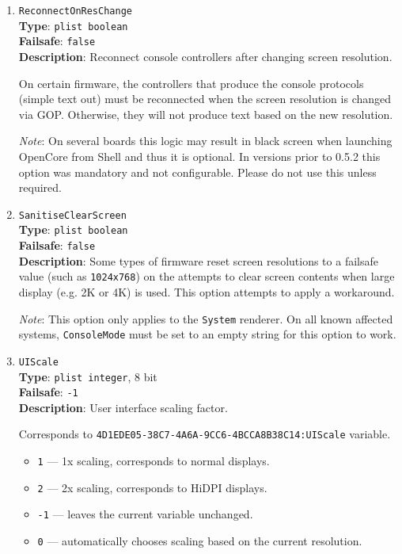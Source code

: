 \documentclass[]{article}
\providecommand{\tightlist}{%
  \setlength{\itemsep}{0pt}\setlength{\parskip}{0pt}}
\begin{document}
\begin{enumerate}
\item
  \texttt{ReconnectOnResChange}\\
  \textbf{Type}: \texttt{plist\ boolean}\\
  \textbf{Failsafe}: \texttt{false}\\
  \textbf{Description}: Reconnect console controllers after changing screen resolution.

  On certain firmware, the controllers that produce the console protocols (simple text out)
  must be reconnected when the screen resolution is changed via GOP. Otherwise, they will
  not produce text based on the new resolution.

  \emph{Note}: On several boards this logic may result in black screen when launching
  OpenCore from Shell and thus it is optional. In versions prior to 0.5.2 this option
  was mandatory and not configurable. Please do not use this unless required.

\item
  \texttt{SanitiseClearScreen}\\
  \textbf{Type}: \texttt{plist\ boolean}\\
  \textbf{Failsafe}: \texttt{false}\\
  \textbf{Description}: Some types of firmware reset screen resolutions to a failsafe
  value (such as \texttt{1024x768}) on the attempts to clear screen contents
  when large display (e.g. 2K or 4K) is used. This option attempts to apply
  a workaround.

  \emph{Note}: This option only applies to the \texttt{System} renderer.
   On all known affected systems, \texttt{ConsoleMode} must be set to
   an empty string for this option to work.

\item
  \texttt{UIScale}\\
  \textbf{Type}: \texttt{plist\ integer}, 8 bit\\
  \textbf{Failsafe}: \texttt{-1}\\
  \textbf{Description}: User interface scaling factor.

  Corresponds to \texttt{4D1EDE05-38C7-4A6A-9CC6-4BCCA8B38C14:UIScale} variable.
  \begin{itemize}
    \tightlist
    \item \texttt{1} --- 1x scaling, corresponds to normal displays.
    \item \texttt{2} --- 2x scaling, corresponds to HiDPI displays.
    \item \texttt{-1} --- leaves the current variable unchanged.
    \item \texttt{0} --- automatically chooses scaling based on the current resolution.
  \end{itemize}


\end{enumerate}
\end{document}
